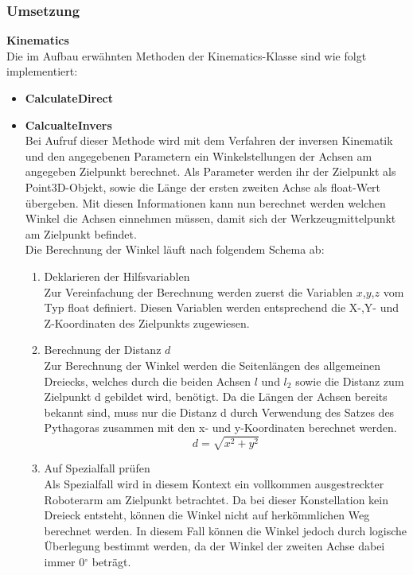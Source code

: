 \subsubsection{Umsetzung}
\textbf{Kinematics}\\
Die im Aufbau erwähnten Methoden der Kinematics-Klasse sind wie folgt implementiert:
\begin{itemize}
\item \textbf{CalculateDirect}\\
\item \textbf{CalcualteInvers}\\
Bei Aufruf dieser Methode wird mit dem Verfahren der inversen Kinematik und den angegebenen Parametern ein Winkelstellungen der Achsen am angegeben Zielpunkt berechnet. Als Parameter werden ihr der Zielpunkt als Point3D-Objekt, sowie die Länge der ersten zweiten Achse als float-Wert übergeben. Mit diesen Informationen kann nun berechnet werden welchen Winkel die Achsen einnehmen müssen, damit  sich der Werkzeugmittelpunkt am Zielpunkt befindet.\\
Die Berechnung der Winkel läuft nach folgendem Schema ab:
\begin{enumerate}
\item Deklarieren der Hilfsvariablen\\
Zur Vereinfachung der Berechnung werden zuerst die Variablen $x$,$y$,$z$ vom Typ float definiert. Diesen Variablen werden entsprechend die X-,Y- und Z-Koordinaten des Zielpunkts zugewiesen.
\item Berechnung der Distanz $d$\\
Zur Berechnung der Winkel werden die Seitenlängen des allgemeinen Dreiecks, welches durch die beiden Achsen $l$ und $l_2$ sowie die Distanz zum Zielpunkt d gebildet wird, benötigt. Da die Längen der Achsen bereits bekannt sind, muss nur die Distanz d durch Verwendung des Satzes des Pythagoras zusammen mit den x- und y-Koordinaten berechnet werden.\\
\begin{equation*}
d = \sqrt{x^2 + y^2}
\end{equation*}
\item Auf Spezialfall prüfen\\
Als Spezialfall wird in diesem Kontext ein vollkommen ausgestreckter Roboterarm am Zielpunkt betrachtet. Da bei dieser Konstellation kein Dreieck entsteht, können die Winkel nicht auf herkömmlichen Weg berechnet werden. In diesem Fall können die Winkel jedoch durch logische Überlegung bestimmt werden, da der Winkel der zweiten Achse dabei immer 0$^\circ$ beträgt.\\

\end{enumerate}
\end{itemize}
